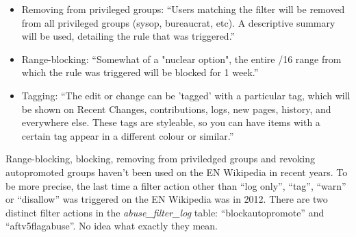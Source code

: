 \begin{itemize}
    \item Removing from privileged groups: ``Users matching the filter will be removed from all privileged groups (sysop, bureaucrat, etc). A descriptive summary will be used, detailing the rule that was triggered.''
    \item Range-blocking: ``Somewhat of a "nuclear option", the entire /16 range from which the rule was triggered will be blocked for 1 week.''
    \item Tagging: ``The edit or change can be 'tagged' with a particular tag, which will be shown on Recent Changes, contributions, logs, new pages, history, and everywhere else. These tags are styleable, so you can have items with a certain tag appear in a different colour or similar.''
\end{itemize}

Range-blocking, blocking, removing from priviledged groups and revoking autopromoted groups haven't been used on the EN Wikipedia in recent years. %
To be more precise, the last time a filter action other than ``log only'', ``tag'', ``warn'' or ``disallow'' was triggered on the EN Wikipedia was in 2012. %
There are two distinct filter actions in the \emph{abuse\_filter\_log} table: ``blockautopromote'' and ``aftv5flagabuse''.
No idea what exactly they mean.

